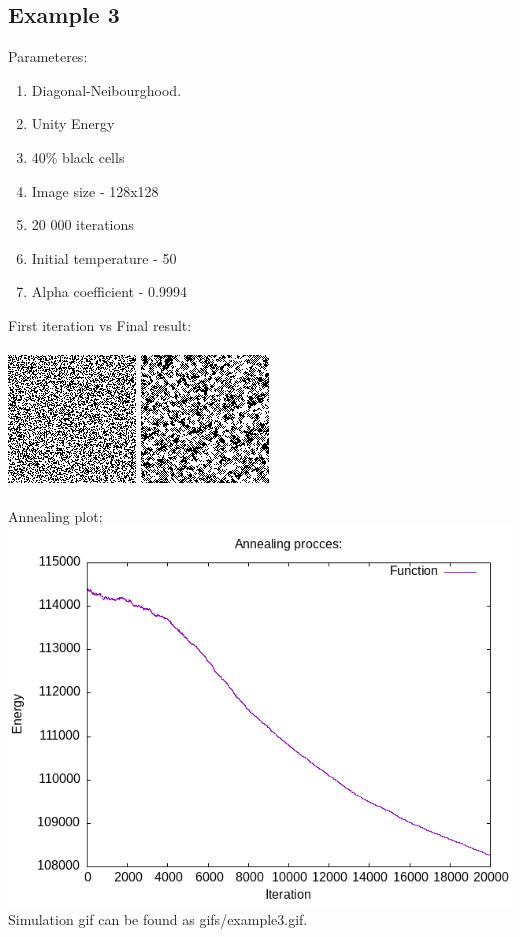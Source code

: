 \documentclass{article}
\begin{document}
\subsection*{Example 3}
Parameteres:
\begin{enumerate}
    \item Diagonal-Neibourghood.
    \item Unity Energy
    \item 40\% black cells
    \item Image size - 128x128
    \item 20 000 iterations
    \item Initial temperature - 50
    \item Alpha coefficient - 0.9994
\end{enumerate}
First iteration vs Final result:
\\\\
\includegraphics*[width = 0.4\linewidth ]{output/fourth/first_iter.png}
\includegraphics*[width = 0.4\linewidth ]{output/fourth/final_result.png}
\\\\
Annealing plot:
\\
\includegraphics*[width = 0.8\linewidth ]{output/fourth/annealing_plot.png}
\\
Simulation gif can be found as gifs/example3.gif. 
\end{document}
